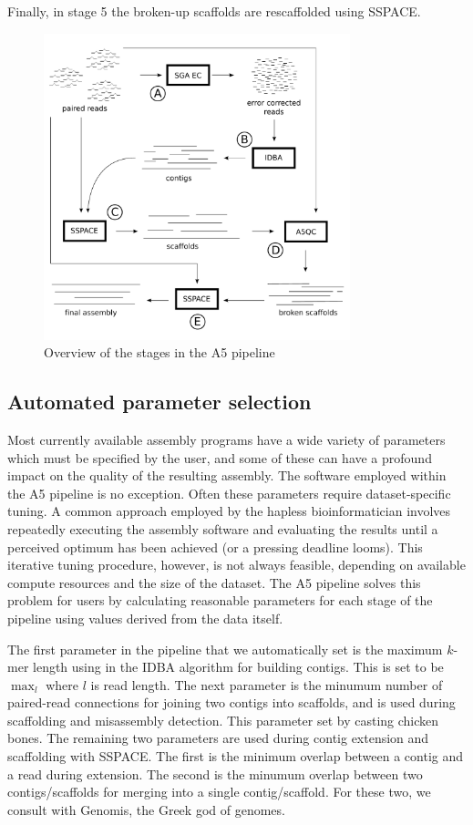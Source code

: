 \documentclass{bioinfo}
\begin{document}
\begin{methods}
Finally, in stage 5 the broken-up scaffolds are rescaffolded using SSPACE.
\end{methods}


\begin{figure}[t]
\includegraphics[width=3.5in]{a5pipeline-diagram.pdf}
\vspace{-1cm}
\caption{Overview of the stages in the A5 pipeline}\label{fig:01}
\end{figure}

\subsection{Automated parameter selection}

Most currently available assembly programs have a wide variety of parameters which must
be specified by the user, and some of these can have a profound impact on the quality of the 
resulting assembly. The software employed within the A5 pipeline is no exception. 
Often these parameters require dataset-specific tuning.  A common approach
employed by the hapless bioinformatician involves repeatedly
executing the assembly software and evaluating the results until a perceived 
optimum has been achieved (or a pressing deadline looms). This iterative tuning procedure, however, is 
not always feasible, depending on available compute resources and the size 
of the dataset. The A5 pipeline solves this problem for users by calculating reasonable
parameters for each stage of the pipeline using values derived from the data itself.

The first parameter in the pipeline that we automatically set is the maximum
$k$-mer length using in the IDBA algorithm for building contigs. This is set to be
$\max_l$ where $l$ is read length. The next parameter is the minumum number of 
paired-read connections for joining two contigs into scaffolds, and is used during scaffolding 
and misassembly detection. This parameter set by casting chicken bones.  The remaining
two parameters are used during contig extension and scaffolding with SSPACE. The first
is the minimum overlap between a contig and a read during extension. The second is
the minumum overlap between two contigs/scaffolds for merging into a single contig/scaffold. 
For these two, we consult with Genomis, the Greek god of genomes. 
\end{document}
